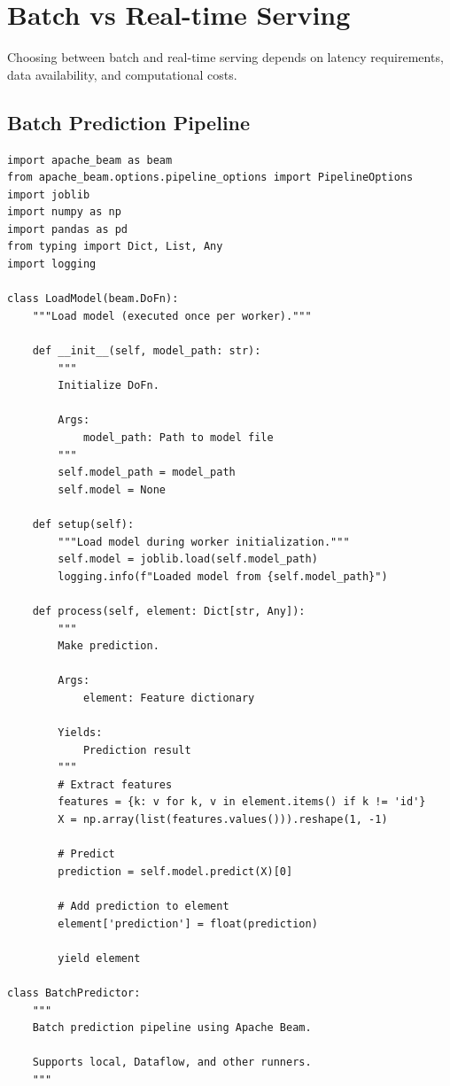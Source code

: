 \section{Batch vs Real-time Serving}

Choosing between batch and real-time serving depends on latency requirements, data availability, and computational costs.

\subsection{Batch Prediction Pipeline}

\begin{lstlisting}[style=python, caption={Scalable Batch Prediction with Apache Beam}]
import apache_beam as beam
from apache_beam.options.pipeline_options import PipelineOptions
import joblib
import numpy as np
import pandas as pd
from typing import Dict, List, Any
import logging

class LoadModel(beam.DoFn):
    """Load model (executed once per worker)."""

    def __init__(self, model_path: str):
        """
        Initialize DoFn.

        Args:
            model_path: Path to model file
        """
        self.model_path = model_path
        self.model = None

    def setup(self):
        """Load model during worker initialization."""
        self.model = joblib.load(self.model_path)
        logging.info(f"Loaded model from {self.model_path}")

    def process(self, element: Dict[str, Any]):
        """
        Make prediction.

        Args:
            element: Feature dictionary

        Yields:
            Prediction result
        """
        # Extract features
        features = {k: v for k, v in element.items() if k != 'id'}
        X = np.array(list(features.values())).reshape(1, -1)

        # Predict
        prediction = self.model.predict(X)[0]

        # Add prediction to element
        element['prediction'] = float(prediction)

        yield element

class BatchPredictor:
    """
    Batch prediction pipeline using Apache Beam.

    Supports local, Dataflow, and other runners.
    """


\end{lstlisting}
